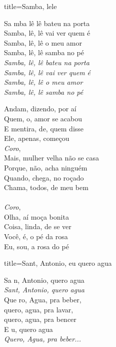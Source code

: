 \documentclass[fontsize=14pt, paper=a4, twoside, DIV=20]{scrreprt} %
\begin{document}
\begin{multicols*}{2}
\begin{song}{title={Samba, lele}}
        \begin{verse*}
        Sa mba lê lê bateu na porta\\
        Samba, lê, lê vai ver quem é\\
        Samba, lê, lê o meu amor\\
        Samba, lê, lê samba no pé\\
        \textit{Samba, lê, lê bateu na porta}\\
        \textit{Samba, lê, lê vai ver quem é}\\
        \textit{Samba, lê, lê o meu amor}\\
        \textit{Samba, lê, lê samba no pé}\\
    \end{verse*}

    \begin{verse*}
        Andam, dizendo, por aí\\
        Quem, o, amor se acabou\\
        E mentira, de, quem disse\\
        Ele, apenas, começou\\
        \textit{Coro},\\
        Mais, mulher velha não se casa\\
        Porque, não, acha ninguém\\
        Quando, chega, no roçado\\
        Chama, todos, de meu bem\\
\\
        \textit{Coro},\\
        Olha, aí moça bonita\\
        Coisa, linda, de se ver\\
        Você, é, o pé da rosa\\
        Eu, sou, a rosa do pé\\
        \end{verse*}
\end{song}

\begin{song}{title={Sant, Antonio, eu quero agua}}
        \begin{verse*}
            Sa n, Antonio, quero agua\\
            \textit{Sant, Antonio, quero agua}\\
            Que ro, Agua, pra beber,\\
            quero, agua, pra lavar,\\
            quero, agua, pra bencer\\
            E u, quero agua\\
            \textit{Quero, Agua, pra beber...}\\
        \end{verse*}
\end{song}


\end{multicols*}
\end{document}
